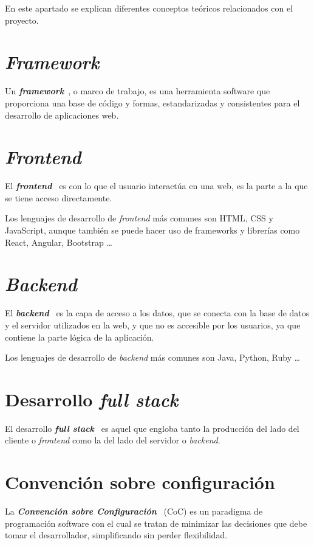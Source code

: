 En este apartado se explican diferentes conceptos teóricos relacionados con el proyecto.

\section{\textit{Framework}}
Un \textbf{\textit{framework}}~\cite{framework_definicion}, o marco de trabajo, es una herramienta software que proporciona una base de código y formas, estandarizadas y consistentes para el desarrollo de aplicaciones web.

\section{\textit{Frontend}}
El \textbf{\textit{frontend}}~\cite{frontend_backend} es con lo que el usuario interactúa en una web, es la parte a la que se tiene acceso directamente. 

Los lenguajes de desarrollo de \textit{frontend} más comunes son HTML, CSS y JavaScript, aunque también se puede hacer uso de frameworks y librerías como React, Angular, Bootstrap \dots

\section{\textit{Backend}}
El \textbf{\textit{backend}}~\cite{frontend_backend} es la capa de acceso a los datos, que se conecta con la base de datos y el servidor utilizados en la web, y que no es accesible por los usuarios, ya que contiene la parte lógica de la aplicación.

Los lenguajes de desarrollo de \textit{backend} más comunes son Java, Python, Ruby \dots

\section{Desarrollo \textit{full stack}}
El desarrollo \textbf{\textit{full stack}}~\cite{desarrollo_full_stack} es aquel que engloba tanto la producción del lado del cliente o \textit{frontend} como la del lado del servidor o \textit{backend}.

\section{Convención sobre configuración} \label{convencion_sobre_configuracion}
La \textbf{\textit{Convención sobre Configuración}}~\cite{wiki:convencion_sobre_configuracion} (CoC) es un paradigma de programación software con el cual se tratan de minimizar las decisiones que debe tomar el desarrollador, simplificando sin perder flexibilidad.